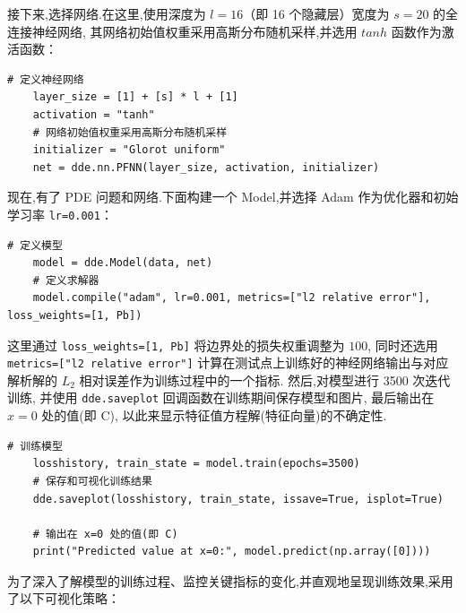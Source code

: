 \documentclass{Sichuan Normal University}
\begin{document}
接下来,选择网络.在这里,使用深度为 $l=16$（即 16 个隐藏层）宽度为 $s=20$ 的全连接神经网络, 其网络初始值权重采用高斯分布随机采样,并选用 $tanh$ 函数作为激活函数：
\begin{lstlisting}[style=python,basicstyle=\footnotesize\fontspec{Courier New},]  
    # 定义神经网络
    layer_size = [1] + [s] * l + [1]
    activation = "tanh"
    # 网络初始值权重采用高斯分布随机采样
    initializer = "Glorot uniform"
    net = dde.nn.PFNN(layer_size, activation, initializer)
\end{lstlisting}
现在,有了 PDE 问题和网络.下面构建一个 Model,并选择 Adam 作为优化器和初始学习率 \texttt{lr=0.001}：
\begin{lstlisting}[style=python,basicstyle=\footnotesize\fontspec{Courier New},]  
    # 定义模型
    model = dde.Model(data, net)
    # 定义求解器
    model.compile("adam", lr=0.001, metrics=["l2 relative error"], loss_weights=[1, Pb])
\end{lstlisting}
这里通过 \texttt{loss\_weights=[1, Pb]} 将边界处的损失权重调整为 $100$, 同时还选用 \texttt{metrics=["l2 relative error"]} 计算在测试点上训练好的神经网络输出与对应解析解的 $L_2$ 相对误差作为训练过程中的一个指标.
然后,对模型进行 3500 次迭代训练, 并使用 \texttt{dde.saveplot} 回调函数在训练期间保存模型和图片, 最后输出在 $x=0$ 处的值(即 C), 以此来显示特征值方程解(特征向量)的不确定性.
\begin{lstlisting}[style=python,basicstyle=\footnotesize\fontspec{Courier New},]  
    # 训练模型
    losshistory, train_state = model.train(epochs=3500)
    # 保存和可视化训练结果
    dde.saveplot(losshistory, train_state, issave=True, isplot=True)

    # 输出在 x=0 处的值(即 C)
    print("Predicted value at x=0:", model.predict(np.array([0])))
\end{lstlisting}

为了深入了解模型的训练过程、监控关键指标的变化,并直观地呈现训练效果,采用了以下可视化策略：
\end{document}
